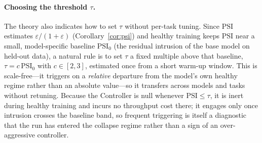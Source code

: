 \documentclass[11pt]{article}
\begin{document}
\paragraph{Choosing the threshold $\tau$.}
The theory also indicates how to set $\tau$ without per-task tuning. Since
$\mathrm{PSI}$ estimates $\varepsilon/(1+\varepsilon)$ (Corollary~\ref{cor:psi}) and healthy training
keeps $\mathrm{PSI}$ near a small, model-specific baseline $\mathrm{PSI}_0$ (the residual intrusion
of the base model on held-out data), a natural rule is to set $\tau$ a fixed multiple above that
baseline, $\tau=c\,\mathrm{PSI}_0$ with $c\in[2,3]$, estimated once from a short warm-up window.
This is scale-free---it triggers on a \emph{relative} departure from the model's own healthy
regime rather than an absolute value---so it transfers across models and tasks without retuning.
Because the Controller is null whenever $\mathrm{PSI}\le\tau$, it is inert during healthy training
and incurs no throughput cost there; it engages only once intrusion crosses the baseline band, so
frequent triggering is itself a diagnostic that the run has entered the collapse regime rather than
a sign of an over-aggressive controller.

\end{document}
